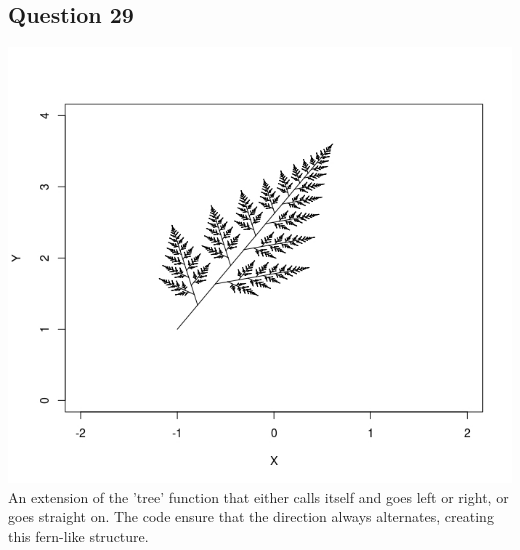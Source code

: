 \documentclass{article}
\begin{document}
\subsection*{Question 29}
\begin{center}
  \includegraphics[width=\textwidth]{../Results/question_29.jpeg}
   {An extension of the 'tree' function that either calls itself
  and goes left or right, or goes straight on. The code ensure that the direction always
  alternates, creating this fern-like structure.}
\end{center}
\end{document}
